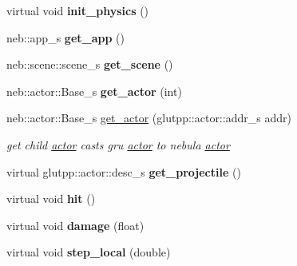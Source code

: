 \begin{DoxyCompactItemize}
\item 
\hypertarget{classneb_1_1actor_1_1Base_a7c2ceae5ca1218f608d869b4bc1b1632}{
virtual void {\bfseries init\_\-physics} ()}
\label{classneb_1_1actor_1_1Base_a7c2ceae5ca1218f608d869b4bc1b1632}

\item 
\hypertarget{classneb_1_1actor_1_1Base_ae3983e94b6e4311f9830fb257bdd430b}{
neb::app\_\-s {\bfseries get\_\-app} ()}
\label{classneb_1_1actor_1_1Base_ae3983e94b6e4311f9830fb257bdd430b}

\item 
\hypertarget{classneb_1_1actor_1_1Base_a9ecd15cc92581b224343e345533ceda8}{
neb::scene::scene\_\-s {\bfseries get\_\-scene} ()}
\label{classneb_1_1actor_1_1Base_a9ecd15cc92581b224343e345533ceda8}

\item 
\hypertarget{classneb_1_1actor_1_1Base_ac993b623947e201f01582ec038673809}{
neb::actor::Base\_\-s {\bfseries get\_\-actor} (int)}
\label{classneb_1_1actor_1_1Base_ac993b623947e201f01582ec038673809}

\item 
neb::actor::Base\_\-s \hyperlink{classneb_1_1actor_1_1Base_a0e31f35ba460d472e9730d1e9e53933d}{get\_\-actor} (glutpp::actor::addr\_\-s addr)
\begin{DoxyCompactList}\small\item\em get child \hyperlink{namespaceneb_1_1actor}{actor} casts gru \hyperlink{namespaceneb_1_1actor}{actor} to nebula \hyperlink{namespaceneb_1_1actor}{actor} \item\end{DoxyCompactList}\item 
\hypertarget{classneb_1_1actor_1_1Base_a6aea29e7c87c3bb8507d2e249fe18a9b}{
virtual glutpp::actor::desc\_\-s {\bfseries get\_\-projectile} ()}
\label{classneb_1_1actor_1_1Base_a6aea29e7c87c3bb8507d2e249fe18a9b}

\item 
\hypertarget{classneb_1_1actor_1_1Base_a83a135f3543d02c0bd8a6d32b6d1d386}{
virtual void {\bfseries hit} ()}
\label{classneb_1_1actor_1_1Base_a83a135f3543d02c0bd8a6d32b6d1d386}

\item 
\hypertarget{classneb_1_1actor_1_1Base_a4c2e2a30b3e7c801e9e4e04552e10b30}{
virtual void {\bfseries damage} (float)}
\label{classneb_1_1actor_1_1Base_a4c2e2a30b3e7c801e9e4e04552e10b30}

\item 
\hypertarget{classneb_1_1actor_1_1Base_af57cfb2160c8263244a2ee0bd9b4b254}{
virtual void {\bfseries step\_\-local} (double)}
\label{classneb_1_1actor_1_1Base_af57cfb2160c8263244a2ee0bd9b4b254}


\end{DoxyCompactItemize}
